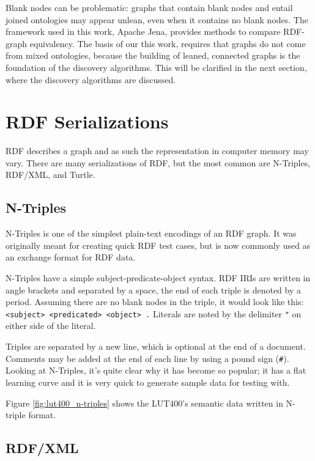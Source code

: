 Blank nodes can be problematic: graphs that contain blank nodes and entail joined ontologies may appear unlean, even when it contains no blank nodes. \cite{Hogan.2014} The framework used in this work, Apache Jena, provides methods to compare RDF-graph equivalency. The basis of our this work, requires that graphs do not come from mixed ontologies, because the building of leaned, connected graphs is the foundation of the discovery algorithms. This will be clarified in the next section, where the discovery algorithms are discussed.


\section{RDF Serializations}
RDF describes a graph and as such the representation in computer memory may vary.\cite{Cyganiak.2014} There are many serializations of RDF, but the most common are N-Triples, RDF/XML, and Turtle.


\subsection{N-Triples}
N-Triples is one of the simplest plain-text encodings of an RDF graph. It was originally meant for creating quick RDF test cases, but is now commonly used as an exchange format for RDF data.

N-Triples have a simple subject-predicate-object syntax. RDF IRIs are written in angle brackets and separated by a space, the end of each triple is denoted by a period. Assuming there are no blank nodes in the triple, it would look like this: \texttt{<subject> <predicated> <object> .} Literals are noted by the delimiter \texttt{"} on either side of the literal.

Triples are separated by a new line, which is optional at the end of a document. Comments may be added at the end of each line by using a pound sign (\texttt{\#}). \cite{.02.10.2017c} Looking at N-Triples, it's quite clear why it has become so popular; it has a flat learning curve and it is very quick to generate sample data for testing with.

Figure \ref{fig:lut400_n-triples} shows the LUT400's semantic data written in N-triple format.

\subsection{RDF/XML}

